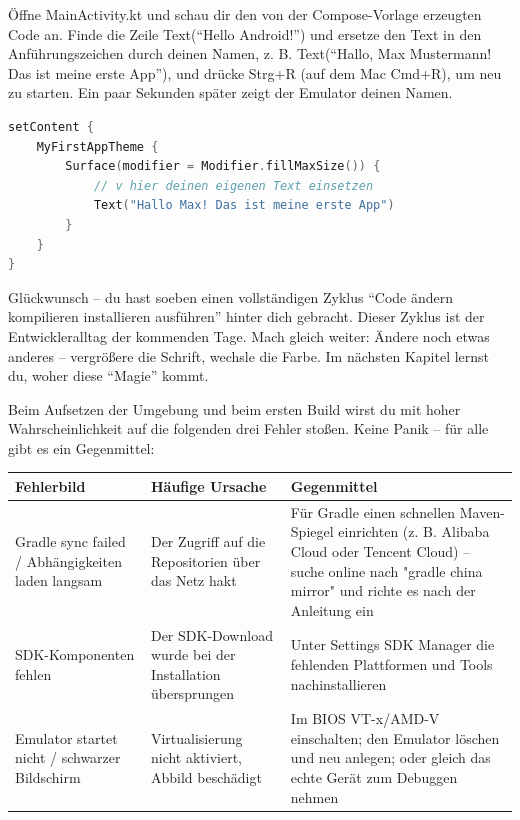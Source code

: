 
Öffne MainActivity.kt und schau dir den von der Compose-Vorlage erzeugten Code an. Finde die Zeile Text(“Hello Android!”) und ersetze den Text in den Anführungszeichen durch deinen Namen, z. B. Text(“Hallo, Max Mustermann! Das ist meine erste App”), und drücke Strg+R (auf dem Mac Cmd+R), um neu zu starten. Ein paar Sekunden später zeigt der Emulator deinen Namen.

\begin{lstlisting}[language=Kotlin]
setContent {
    MyFirstAppTheme {
        Surface(modifier = Modifier.fillMaxSize()) {
            // v hier deinen eigenen Text einsetzen
            Text("Hallo Max! Das ist meine erste App")
        }
    }
}
\end{lstlisting}

Glückwunsch – du hast soeben einen vollständigen Zyklus “Code ändern kompilieren installieren ausführen” hinter dich gebracht. Dieser Zyklus ist der Entwickleralltag der kommenden Tage. Mach gleich weiter: Ändere noch etwas anderes – vergrößere die Schrift, wechsle die Farbe. Im nächsten Kapitel lernst du, woher diese “Magie” kommt.


Beim Aufsetzen der Umgebung und beim ersten Build wirst du mit hoher Wahrscheinlichkeit auf die folgenden drei Fehler stoßen. Keine Panik – für alle gibt es ein Gegenmittel:

\begin{center}
\begin{tabularx}{\linewidth}{|X|X|X|}
\hline
\textbf{Fehlerbild} & \textbf{Häufige Ursache} & \textbf{Gegenmittel} \tabularnewline
\hline
Gradle sync failed / Abhängigkeiten laden langsam & Der Zugriff auf die Repositorien über das Netz hakt & Für Gradle einen schnellen Maven-Spiegel einrichten (z. B. Alibaba Cloud oder Tencent Cloud) – suche online nach "gradle china mirror" und richte es nach der Anleitung ein \tabularnewline
SDK-Komponenten fehlen & Der SDK-Download wurde bei der Installation übersprungen & Unter Settings SDK Manager die fehlenden Plattformen und Tools nachinstallieren \tabularnewline
Emulator startet nicht / schwarzer Bildschirm & Virtualisierung nicht aktiviert, Abbild beschädigt & Im BIOS VT-x/AMD-V einschalten; den Emulator löschen und neu anlegen; oder gleich das echte Gerät zum Debuggen nehmen \tabularnewline
\hline
\end{tabularx}
\end{center}

